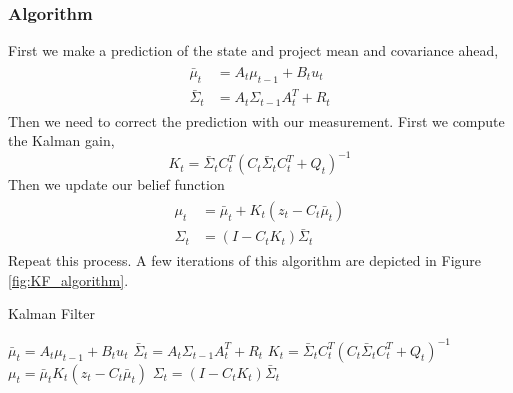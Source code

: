 \documentclass[twoside]{article}
\begin{document}
\subsubsection{Algorithm}
First we make a prediction of the state and project mean and covariance ahead,
\begin{align}
\begin{split}
\bar{\mu}_t &= A_t\mu_{t-1}+B_t u_t \\
\bar{\Sigma}_t &= A_t\Sigma_{t-1} A_t^{T} + R_t
\end{split}
\label{LinDyn}
\end{align}
Then we need to correct the prediction with our measurement. First we compute the Kalman gain,
\begin{equation}
K_t = \bar{\Sigma}_{t}C_t^{T}(C_t\bar{\Sigma}_{t}C_t^{T}+Q_t)^{-1}
\end{equation}
Then we update our belief function 
\begin{align}
\begin{split}
\mu_t &= \bar{\mu}_t + K_t(z_t-C_t\bar\mu_{t})\\
\Sigma_t &= (I-C_t K_t)\bar{\Sigma}_t
\end{split}
\label{KF}
\end{align}
Repeat this process.
A few iterations of this algorithm are depicted in Figure \ref{fig:KF_algorithm}.

\begin{algorithm}[H]
\caption{Kalman Filter}
	$	\bar{\mu}_t = A_t\mu_{t-1}+B_t u_t$\;
	$	\bar{\Sigma}_t = A_t\Sigma_{t-1} A_t^{T} + R_t$\;	
	$ 	K_t = \bar{\Sigma}_{t}C_t^{T}(C_t\bar{\Sigma}_{t}C_t^{T}+Q_t)^{-1}$\;	
	$    \mu_t = \bar{\mu}_t K_t(z_t-C_t\bar\mu_{t})$\;	
	$   \Sigma_t = (I-C_t K_t)\bar{\Sigma}_t$\;
\end{algorithm}
\end{document}
